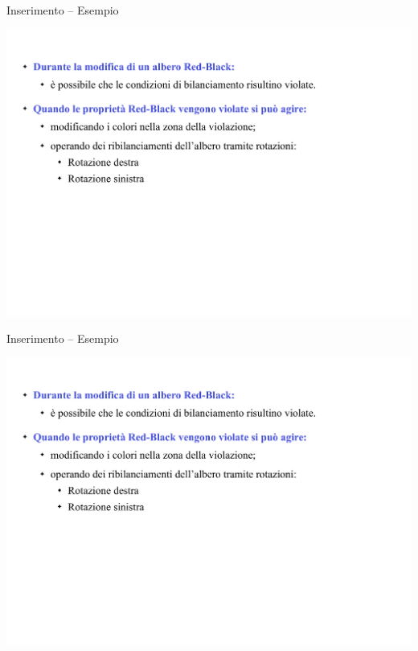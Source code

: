 \begin{frame}{Inserimento -- Esempio}

\includegraphics[width=1.0\textwidth,page=23]{redblack2.pdf}

\end{frame}

\begin{frame}{Inserimento -- Esempio}

\includegraphics[width=1.0\textwidth,page=24]{redblack2.pdf}

\end{frame}

